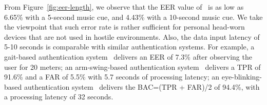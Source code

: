 From Figure~\ref{fig:eer-length}, we observe that the EER value of \systemname~is as low as 6.65\% with a 5-second music cue, and 4.43\% with a 10-second music cue. We take the viewpoint that such error rate is rather sufficient for personal head-worn devices that are not used in hostile environments. Also, the data input latency of 5-10 seconds is comparable with similar authentication systems. For example, a gait-based authentication system~\cite{gafurov2006biometric} delivers an EER of 7.3\% after observing the user for 20 meters;
an arm-swing-based authentication system~\cite{ahmed2015checksum} delivers a TPR of 91.6\% and  a FAR of 5.5\%  with 5.7 seconds of processing latency; an eye-blinking-based authentication system~\cite{rogers2015approach} delivers the BAC=(TPR + FAR)/2 of 94.4\%, with a processing latency of 32 seconds.
%







